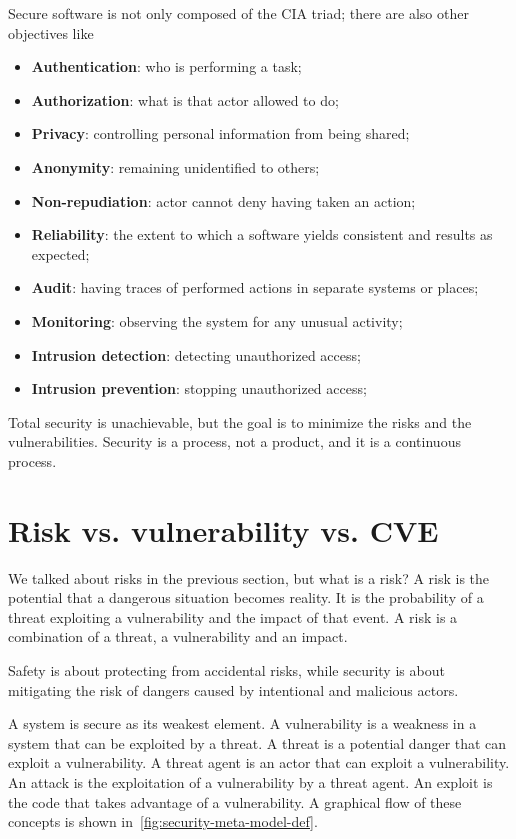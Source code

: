 Secure software is not only composed of the CIA triad; there are also other objectives like~\cite{marchetto-st-slides}
\begin{itemize}
  \item \textbf{Authentication}: who is performing a task;
  \item \textbf{Authorization}: what is that actor allowed to do;
  \item \textbf{Privacy}: controlling personal information from being shared;
  \item \textbf{Anonymity}: remaining unidentified to others;
  \item \textbf{Non-repudiation}: actor cannot deny having taken an action;
  \item \textbf{Reliability}: the extent to which a software yields consistent and results as expected;
  \item \textbf{Audit}: having traces of performed actions in separate systems or places;
  \item \textbf{Monitoring}: observing the system for any unusual activity;
  \item \textbf{Intrusion detection}: detecting unauthorized access;
  \item \textbf{Intrusion prevention}: stopping unauthorized access;
\end{itemize}

Total security is unachievable, but the goal is to minimize the risks and the vulnerabilities. Security is a process, not a product, and it is a continuous process.~\cite{marchetto-st-slides}

\section{Risk vs. vulnerability vs. CVE}

We talked about risks in the previous section, but what is a risk? A risk is the potential that a dangerous situation becomes reality. It is the probability of a threat exploiting a vulnerability and the impact of that event. A risk is a combination of a threat, a vulnerability and an impact.

Safety is about protecting from accidental risks, while security is about mitigating the risk of dangers caused by intentional and malicious actors.

A system is secure as its weakest element. A vulnerability is a weakness in a system that can be exploited by a threat. A threat is a potential danger that can exploit a vulnerability. A threat agent is an actor that can exploit a vulnerability. An attack is the exploitation of a vulnerability by a threat agent. An exploit is the code that takes advantage of a vulnerability. A graphical flow of these concepts is shown in~\cref{fig:security-meta-model-def}.

